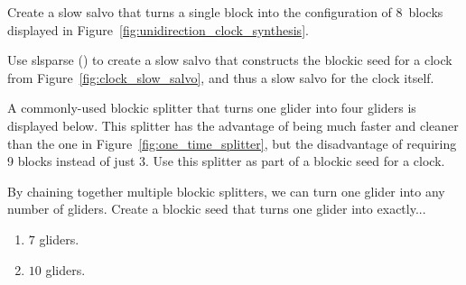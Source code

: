 \begin{multicols}{2}
\mfilbreak


\begin{problem}\label{exer:create_clock_turners}
	Create a slow salvo that turns a single block into the configuration of $8$~blocks displayed in Figure~\ref{fig:unidirection_clock_synthesis}.
	
\end{problem}


\mfilbreak


\begin{problem}\label{exer:create_clock_turners_nonsync}
	Use slsparse () to create a slow salvo that constructs the blockic seed for a clock from Figure~\ref{fig:clock_slow_salvo}, and thus a slow salvo for the clock itself.
\end{problem}


\mfilbreak


\begin{problem}\label{exer:new_splitter}
	A commonly-used blockic splitter that turns one glider into four gliders is displayed below. This splitter has the advantage of being much faster and cleaner than the one in Figure~\ref{fig:one_time_splitter}, but the disadvantage of requiring 9 blocks instead of just 3. Use this splitter as part of a blockic seed for a clock.
	\begin{center}
	\end{center}
\end{problem}


\mfilbreak


\begin{problem}\label{exer:blockic_splitter_chain}
	By chaining together multiple blockic splitters, we can turn one glider into any number of gliders. Create a blockic seed that turns one glider into exactly...
	\begin{enumerate}[label=\bf\color{ocre}(\alph*)]
		\item $7$ gliders.
		
		\item $10$ gliders.
		

\end{enumerate}
\end{problem}
\end{multicols}
